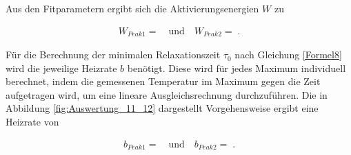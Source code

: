 Aus den Fitparametern ergibt sich die Aktivierungsenergien $W$ zu

\begin{align}
	W_{Peak1} =   \quad \text{und} \quad W_{Peak2} = \;.
\end{align}

Für die Berechnung der minimalen Relaxationszeit $\tau_0$ nach Gleichung \eqref{Formel8} wird die jeweilige Heizrate $b$ benötigt.
Diese wird für jedes Maximum individuell berechnet, indem die gemessenen Temperatur im Maximum gegen die Zeit aufgetragen wird, um eine lineare Ausgleichsrechnung durchzuführen. Die in Abbildung \ref{fig:Auswertung_11_12} dargestellt Vorgehensweise ergibt eine Heizrate von 

\begin{align}
	b_{Peak1} =   \quad \text{und} \quad b_{Peak2} = \;.
\end{align}

